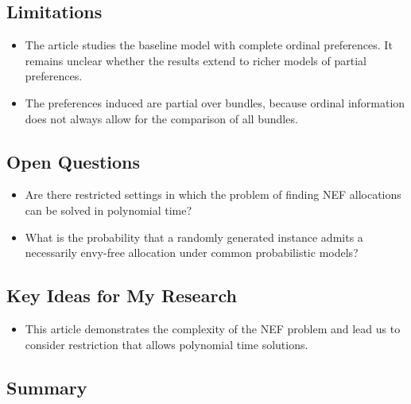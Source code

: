 \documentclass[12pt,a4paper]{article}
\begin{document}
\subsection*{Limitations}
\begin{itemize}
    \item The article studies the baseline model with complete ordinal preferences. It remains unclear whether the results extend to richer models of partial preferences.
    \item The preferences induced are partial over bundles, because ordinal information does not always allow for the comparison of all bundles.
\end{itemize}

\subsection*{Open Questions}
\begin{itemize}
    \item Are there restricted settings in which the problem of finding NEF allocations can be solved in polynomial time?

    \item What is the probability that a randomly generated instance admits a necessarily envy-free allocation under common probabilistic models?
\end{itemize}

\subsection*{Key Ideas for My Research}
\label{subsec:relevance4}
\begin{itemize}
    \item This article demonstrates the complexity of the NEF problem and lead us to consider restriction that allows polynomial time solutions.
\end{itemize}
\subsection*{Summary}
\end{document}
